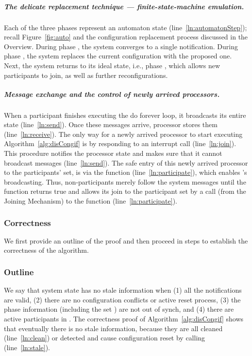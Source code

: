 \documentclass[11pt]{article}
\begin{document}
\subparagraph{The delicate replacement technique --- finite-state-machine emulation.}
Each of the three phases represent an automaton state (line~\ref{ln:automatonStep}); recall Figure~\ref{fig:auto} and the configuration replacement process discussed
in the Overview.  
During phase , the system converges to a single notification. During phase , the system replaces the current configuration with the proposed one. Next, the system returns to its ideal state, i.e., phase , which allows new participants to join, as well as further reconfigurations.


\subparagraph{Message exchange and the control of newly arrived processors.}
When a participant finishes executing the do forever loop, it broadcasts its entire state (line~\ref{ln:send}). Once these messages arrive, processor  stores them (line~\ref{ln:receive}). The only way for a newly arrived processor to start executing Algorithm~\ref{alg:disCongif} is by responding to an interrupt call (line~\ref{ln:join}). This procedure notifies the processor state and makes sure that it cannot broadcast messages (line~\ref{ln:send}). The safe entry of this newly arrived processor to the participants' set, is via the function  (line~\ref{ln:participate}), which enables 's broadcasting. Thus, non-participants merely follow the system messages until the function  returns true and allows its join to the participant set by a call (from the Joining Mechanism) to the function  (line~\ref{ln:participate}).




\subsubsection{Correctness}
\label{sec:recSAproof}

We first provide an outline of the proof and then proceed in steps to establish the correctness of the algorithm.
\subsubsection*{Outline} 
We say that system state  has no stale information when (1) all the notifications are valid, (2) there are no configuration  conflicts or active reset process, (3) the phase information (including the set ) are not out of synch, and (4) there are active participants  in . The correctness proof of Algorithm~\ref{alg:disCongif} shows that eventually there is no stale information, because they are all cleaned (line~\ref{ln:clean}) or detected and cause configuration reset by calling  (line~\ref{ln:stale}).
\end{document}

